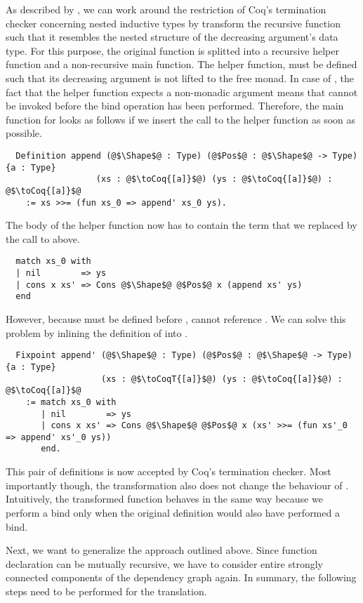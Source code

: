 As described by \cite{Dylus:2018}, we can work around the restriction of Coq's termination checker concerning nested inductive types by transform the recursive function such that it resembles the nested structure of the decreasing argument's data type.
For this purpose, the original function is splitted into a recursive helper function and a non-recursive main function.
The helper function, must be defined such that its decreasing argument is not lifted to the free monad.
In case of , the fact that the helper function  expects a non-monadic argument means that  cannot be invoked before the bind operation has been performed.
Therefore, the main function for  looks as follows if we insert the call to the helper function as soon as possible.
\begin{verbatim}
  Definition append (@$\Shape$@ : Type) (@$Pos$@ : @$\Shape$@ -> Type) {a : Type}
                  (xs : @$\toCoq{[a]}$@) (ys : @$\toCoq{[a]}$@) : @$\toCoq{[a]}$@
    := xs >>= (fun xs_0 => append' xs_0 ys).
\end{verbatim}
The body of the helper function now has to contain the  term that we replaced by the call to  above.
\begin{verbatim}
  match xs_0 with
  | nil        => ys
  | cons x xs' => Cons @$\Shape$@ @$Pos$@ x (append xs' ys)
  end
\end{verbatim}
However, because  must be defined before ,  cannot reference .
We can solve this problem by inlining the definition of  into .
\begin{verbatim}
  Fixpoint append' (@$\Shape$@ : Type) (@$Pos$@ : @$\Shape$@ -> Type) {a : Type}
                   (xs : @$\toCoqT{[a]}$@) (ys : @$\toCoq{[a]}$@) : @$\toCoq{[a]}$@
    := match xs_0 with
       | nil        => ys
       | cons x xs' => Cons @$\Shape$@ @$Pos$@ x (xs' >>= (fun xs'_0 => append' xs'_0 ys))
       end.
\end{verbatim}
This pair of definitions is now accepted by Coq's termination checker.
Most importantly though, the transformation also does not change the behaviour of .
Intuitively, the transformed function behaves in the same way because we perform a bind only when the original definition would also have performed a bind.

Next, we want to generalize the approach outlined above.
Since function declaration can be mutually recursive, we have to consider entire strongly connected components of the dependency graph again.
In summary, the following steps need to be performed for the translation.

